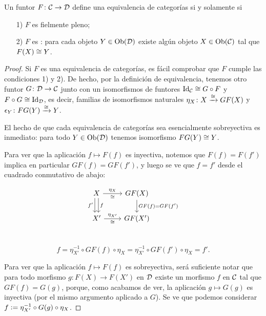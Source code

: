 \documentclass{article}
\numberwithin{equation}{section}
\theoremstyle{definition}
\begin{document}
\begin{proposicion}
  \label{equivalencia-fielmente-pleno-y-esencialmente-sobreyectivo}
  Un funtor $F\colon \mathcal{C} \to \mathcal{D}$ define una equivalencia de
  categorías si y solamente si

  \begin{enumerate}
  \item[1)] $F$ es fielmente pleno;

  \item[2)] $F$ es : para cada objeto
    $Y \in \operatorname{Ob} (\mathcal{D})$ existe algún objeto $X \in \operatorname{Ob} (\mathcal{C})$ tal
    que $F (X) \cong Y$.
  \end{enumerate}

\begin{proof}
  Si $F$ es una equivalencia de categorías, es fácil comprobar que $F$ cumple
  las condiciones 1) y 2). De hecho, por la definición de equivalencia, tenemos
  otro funtor $G\colon \mathcal{D} \to \mathcal{C}$ junto con un isomorfismos de
  funtores $\operatorname{Id}_\mathcal{C} \cong G\circ F$ y $F\circ G \cong \operatorname{Id}_\mathcal{D}$, es
  decir, familias de isomorfismos naturales
  $\eta_X\colon X\xrightarrow{\cong} G F (X)$ y
  $\epsilon_Y\colon FG (Y) \xrightarrow{\cong} Y$.

  El hecho de que cada equivalencia de categorías sea esencialmente sobreyectiva
  es inmediato: para todo $Y\in \operatorname{Ob} (\mathcal{D})$ tenemos isomorfismo
  $F G (Y) \cong Y$.

  Para ver que la aplicación $f \mapsto F (f)$ es inyectiva, notemos que
  $F (f) = F (f')$ implica en particular $GF (f) = GF (f')$, y luego se ve que
  $f = f'$ desde el cuadrado conmutativo de abajo:

  \[ \begin{tikzcd}
      X\ar{r}{\eta_X}[swap]{\isom}\ar[shift left=0.25em]{d}{f}\ar[shift right=0.25em]{d}[swap]{f'} & G F (X)\ar{d}{GF (f) = GF (f')} \\
      X'\ar{r}{\eta_{X'}}[swap]{\isom} & G F (X') \\
    \end{tikzcd} \]

  \[ f = \eta_{X'}^{-1} \circ GF (f) \circ \eta_X =
     \eta_{X'}^{-1} \circ GF (f') \circ \eta_X = f'. \]

   Para ver que la aplicación $f \mapsto F (f)$ es sobreyectiva, será suficiente
   notar que para todo morfismo $g\colon F(X)\to F(X')$ en $\mathcal{D}$ existe
   un morfismo $f$ en $\mathcal{C}$ tal que $GF (f) = G (g)$, porque, como
   acabamos de ver, la aplicación $g \mapsto G (g)$ es inyectiva (por el mismo
   argumento aplicado a $G$). Se ve que podemos considerar
   $f \mathrel{\mathop:}= \eta_{X'}^{-1} \circ G (g) \circ \eta_X$.


\end{proof}
\end{proposicion}
\end{document}
